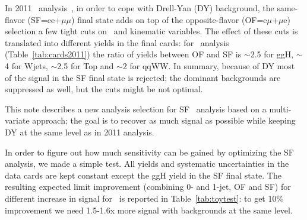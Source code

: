 In 2011 \hww\ analysis~\cite{ref:hwwpaper,ref:hwwsmurfs}, in order to cope with Drell-Yan (DY) background, the same-flavor (SF=ee+$\mu\mu$) final state adds 
on top of the opposite-flavor (OF=e$\mu$+$\mu$e) selection a few tight cuts on \met\ and kinematic variables.
The effect of these cuts is translated into different yields in the final cards: for  \GeVcc\ analysis (Table~\ref{tab:cards2011}) the ratio of yields
between OF and SF is $\sim$2.5 for ggH, $\sim$4 for Wjets, $\sim$2.5 for Top and $\sim$2 for qqWW.
In summary, because of DY most of the signal in the SF final state is rejected; 
the dominant backgrounds are suppressed as well, but the cuts might be not optimal. 

This note describes a new analysis selection for SF \hww\ analysis based on a multi-variate approach; 
the goal is to recover as much signal as possible while keeping DY at the same level as in 2011 analysis.

In order to figure out how much sensitivity can be gained by optimizing the SF analysis, we made a simple test. 
All yields and systematic uncertainties in the data cards are kept constant except the ggH yield in the SF final state.
The resulting expected limit improvement (combining 0- and 1-jet, OF and SF) for different increase in signal for  \GeVcc\ is reported in Table~\ref{tab:toytest}:
to get 10\% improvement we need 1.5-1.6x more signal with backgrounds at the same level.

